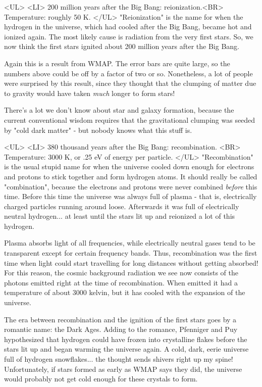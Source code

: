 <UL>
<LI>
200 million years after the Big Bang: reionization.<BR>
Temperature: roughly 50 K.
</UL>
"Reionization" is the name for when the hydrogen in the universe,
which had cooled after the Big Bang, became hot and ionized again.
The most likely cause is radiation from the very first stars.  So, we
now think the first stars ignited about 200 million years after the
Big Bang.

Again this is a result from WMAP.  The error bars are quite large, so
the numbers above could be off by a factor of two or so.  Nonetheless,
a lot of people were surprised by this result, since they thought that
the clumping of matter due to gravity would have taken \emph{much} longer to
form stars!

There's a lot we don't know about star and galaxy formation, because
the current conventional wisdom requires that the gravitational
clumping was seeded by "cold dark matter" - but nobody knows what this
stuff is.


<UL>
<LI>
380 thousand years after the Big Bang: recombination.  <BR>
Temperature: 3000 K, or .25 eV of energy per particle.
</UL>
"Recombination" is the usual stupid name for when the
universe cooled down enough for electrons and protons to stick
together and form hydrogen atoms.  It should really be called
"combination", because the electrons and protons were never
combined \emph{before} this time.  Before this time the universe was always
full of plasma - that is, electrically charged particles running
around loose.  Afterwards it was full of electrically neutral
hydrogen... at least until the stars lit up and reionized a lot of
this hydrogen.

Plasma absorbs light of all frequencies, while electrically neutral
gases tend to be transparent except for certain frequency bands.
Thus, recombination was the first time when light could start
travelling for long distances without getting absorbed!  For this
reason, the cosmic background radiation we see now consists of the
photons emitted right at the time of recombination.  When emitted it
had a temperature of about 3000 kelvin, but it has cooled with the
expansion of the universe.

The era between recombination and the ignition of the first stars goes
by a romantic name: the Dark Ages.  Adding to the romance, Pfenniger
and Puy hypothesized that hydrogen could have frozen into crystalline
flakes before the stars lit up and began warming the universe again.
A cold, dark, eerie universe full of hydrogen snowflakes... the
thought sends shivers right up my spine!  Unfortunately, if stars
formed as early as WMAP says they did, the universe would probably 
not get cold enough for these crystals to form.  

